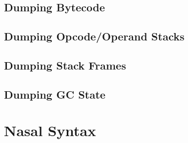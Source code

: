 \documentclass{article}
\newcommand{\todo}[1]{}
\begin{document}
\subsection{Dumping Bytecode}
\subsection{Dumping Opcode/Operand Stacks}
\subsection{Dumping Stack Frames}
\subsection{Dumping GC State}

\section{Nasal Syntax}
\todo{A guide to the syntax of Nasal, loopoids, expressions, etc.}
\end{document}
